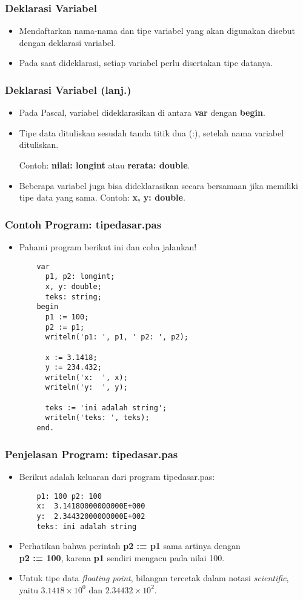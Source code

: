 \begin{frame}
\frametitle{Deklarasi Variabel}
\begin{itemize}
  \item Mendaftarkan nama-nama dan tipe variabel yang akan digunakan disebut dengan deklarasi variabel.
  \item Pada saat dideklarasi, setiap variabel perlu disertakan tipe datanya.
\end{itemize}
\end{frame}

\begin{frame}
\frametitle{Deklarasi Variabel (lanj.)}
\begin{itemize}
  \item Pada Pascal, variabel dideklarasikan di antara \textbf{var} dengan \textbf{begin}.
  \item Tipe data dituliskan sesudah tanda titik dua (:), setelah nama variabel dituliskan.

  Contoh: \textbf{nilai: longint} atau \textbf{rerata: double}.
  \item Beberapa variabel juga bisa dideklarasikan secara bersamaan jika memiliki tipe data yang sama. Contoh: \textbf{x, y: double}.
\end{itemize}
\end{frame}


\begin{frame}[fragile]
\frametitle{Contoh Program: tipedasar.pas}
\begin{itemize}
  \item Pahami program berikut ini dan coba jalankan!
  \begin{lstlisting}
    var
      p1, p2: longint;
      x, y: double;
      teks: string;
    begin
      p1 := 100;
      p2 := p1;
      writeln('p1: ', p1, ' p2: ', p2);

      x := 3.1418;
      y := 234.432;
      writeln('x:  ', x);
      writeln('y:  ', y);

      teks := 'ini adalah string';
      writeln('teks: ', teks);
    end.
  \end{lstlisting}
\end{itemize}
\end{frame}

\begin{frame}[fragile]
\frametitle{Penjelasan Program: tipedasar.pas}
\begin{itemize}
  \item Berikut adalah keluaran dari program tipedasar.pas:
  \begin{lstlisting}
    p1: 100 p2: 100
    x:  3.14180000000000E+000
    y:  2.34432000000000E+002
    teks: ini adalah string
  \end{lstlisting}
  \item Perhatikan bahwa perintah \textbf{p2 := p1} sama artinya dengan \\ \textbf{p2 := 100}, karena \textbf{p1} sendiri mengacu pada nilai 100.
  \item Untuk tipe data \textit{floating point}, bilangan tercetak dalam notasi \textit{scientific}, yaitu $3.1418 \times 10^{0}$ dan $2.34432 \times 10^{2}$.
\end{itemize}
\end{frame}

